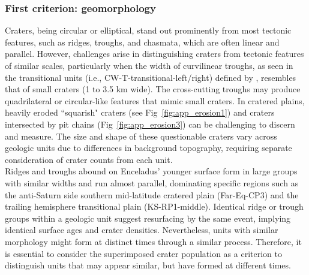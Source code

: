 \documentclass[preprint,11pt,3p,times,authoryear]{elsarticle}
\begin{document}
\subsubsection{First criterion: geomorphology}
Craters, being circular or elliptical, stand out prominently from most tectonic features, such as ridges, troughs, and chasmata, which are often linear and parallel. However, challenges arise in distinguishing craters from tectonic features of similar scales, particularly when the width of curvilinear troughs, as seen in the transitional units (i.e., CW-T-transitional-left/right) defined by \citet{CrowWillard2015}, resembles that of small craters (1 to 3.5 km wide). The cross-cutting troughs may produce quadrilateral or circular-like features that mimic small craters.
In cratered plains, heavily eroded ``squarish" craters (see Fig~\ref{fig:app_erosion1}) and craters intersected by pit chains (Fig~\ref{fig:app_erosion3}) can be challenging to discern and measure. The size and shape of these questionable craters vary across geologic units due to differences in background topography, requiring separate consideration of crater counts from each unit.\\

Ridges and troughs abound on Enceladus’ younger surface form in large groups with similar widths and run almost parallel, dominating specific regions such as the anti-Saturn side southern mid-latitude cratered plain (Far-Eq-CP3) and the trailing hemisphere transitional plain (KS-RP1-middle). Identical ridge or trough groups within a geologic unit suggest resurfacing by the same event, implying identical surface ages and crater densities. Nevertheless, units with similar morphology might form at distinct times through a similar process. Therefore, it is essential to consider the superimposed crater population as a criterion to distinguish units that may appear similar, but have formed at different times.
\end{document}
